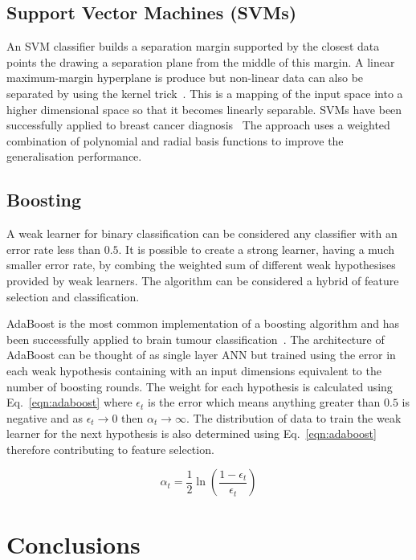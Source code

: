 \documentclass[journal]{IEEEtran}
\begin{document}
\subsection{Support Vector Machines (SVMs)}
An SVM classifier builds a separation margin supported by the closest data points the drawing a separation plane from the middle of this margin.
A linear maximum-margin hyperplane is produce but non-linear data can also be separated by using the kernel trick~\cite{cortes95support}. 
This is a mapping of the input space into a higher dimensional space so that it becomes linearly separable.
SVMs have been successfully applied to breast cancer diagnosis~\cite{xiufeng13svm}
The approach uses a weighted combination of polynomial and radial basis functions to improve the generalisation performance.



\subsection{Boosting}
A weak learner for binary classification can be considered any classifier with an error rate less than $0.5$.
It is possible to create a strong learner, having a much smaller error rate, by combing the weighted sum of different weak hypothesises provided by weak learners. 
The algorithm can be considered a hybrid of feature selection and classification.

AdaBoost is the most common implementation of a boosting algorithm and has been successfully applied to brain tumour classification~\cite{freund99boost,islam13multi}.
The architecture of AdaBoost can be thought of as single layer ANN but trained using the error in each weak hypothesis containing with an input dimensions equivalent to the number of boosting rounds.
The weight for each hypothesis is calculated using Eq.~\eqref{eqn:adaboost} where $\epsilon_t$ is the error which means anything greater than $0.5$ is negative and as $\epsilon_t \to 0$ then $\alpha_t \to \infty$.
The distribution of data to train the weak learner for the next hypothesis is also determined using Eq.~\eqref{eqn:adaboost} therefore contributing to feature selection.


\begin{equation}
	\alpha_t = \frac{1}{2}\ln\left(\frac{1 - \epsilon_t}{\epsilon_t}\right)
	\label{eqn:adaboost}
\end{equation}






\section{Conclusions}
\label{sec:conclusions}
\end{document}
